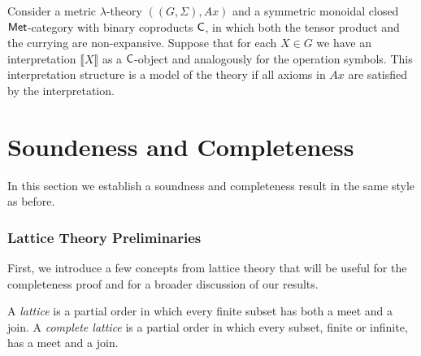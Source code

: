 \begin{definition} \label{def:model_metric_cond}
  Consider a metric $\lambda$-theory $((G,\Sigma),Ax)$ and a symmetric monoidal closed $\mathsf{Met}$-category with binary coproducts $\mathsf{C}$, in which both the tensor product and the currying are non-expansive. Suppose that for each $X \in G$ we have an interpretation $\llbracket X \rrbracket$ as a $\mathsf{C}$-object and analogously for the operation symbols. This interpretation structure is a model of the theory if all axioms in $Ax$ are satisfied by the interpretation.
\end{definition}

\section{Soundeness and Completeness}
In this section we establish a soundness and completeness result in the same style as before. 


\subsubsection{Lattice Theory Preliminaries}
First, we introduce a few concepts from lattice theory that will be useful for the completeness proof and for a broader discussion of our results.


\begin{definition}
   A \emph{lattice} is a partial order in which every finite subset has both a meet and a join. A \emph{complete lattice} is a partial order  in which every subset, finite or infinite, has a meet and a join.
\end{definition}

